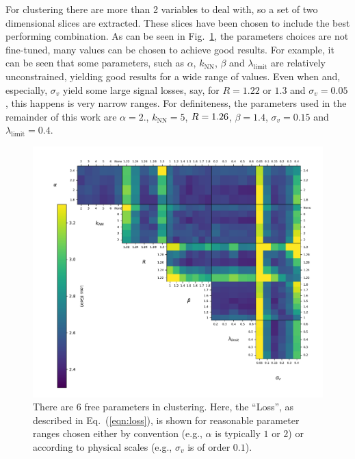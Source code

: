 For \spectral{} clustering there are more than 2 variables to deal with, 
so a set of two dimensional slices are extracted. 
These slices have been chosen to include the best performing combination.
%
    As can be seen in Fig.~\ref{fig:scan_spectral}, the parameters choices are not fine-tuned,
    many values can be chosen to achieve good results.
    For example, it can be seen that some parameters, such as \(\alpha\), \(k_\text{NN}\), \(\beta\)
    and \(\lambda_\text{limit}\) are relatively unconstrained,
    yielding  good results for a wide range of values.
    Even when \stoppingdeltar{} and, especially, \(\sigma_v\) yield some large signal losses,
    say, for \(R=1.22\) or \(1.3\) and \(\sigma_v=0.05\), this happens is very narrow ranges. 
    For definiteness, the
    parameters used in the remainder of this work are \(\alpha=2.\), \(k_\text{NN}=5\), \(R{} = 1.26\), \(\beta = 1.4\), \(\sigma_v = 0.15\) and \(\lambda_\text{limit} = 0.4\).
\clearpage
    \begin{figure}[!t]
            \includegraphics[width=1\textwidth]{graphics/trangle_scan_complete}
            \caption{There are 6 free parameters in \spectral{} clustering.
                Here, the ``Loss'', as described in Eq.~(\ref{eqn:loss}), is shown for reasonable  parameter ranges chosen
                either by convention (e.g., \(\alpha\) is typically \(1\) or \(2\))
                or according to physical scales (e.g., $\sigma_v$ is of order \(0.1\)).
             }\label{fig:scan_spectral}
    \end{figure}    


